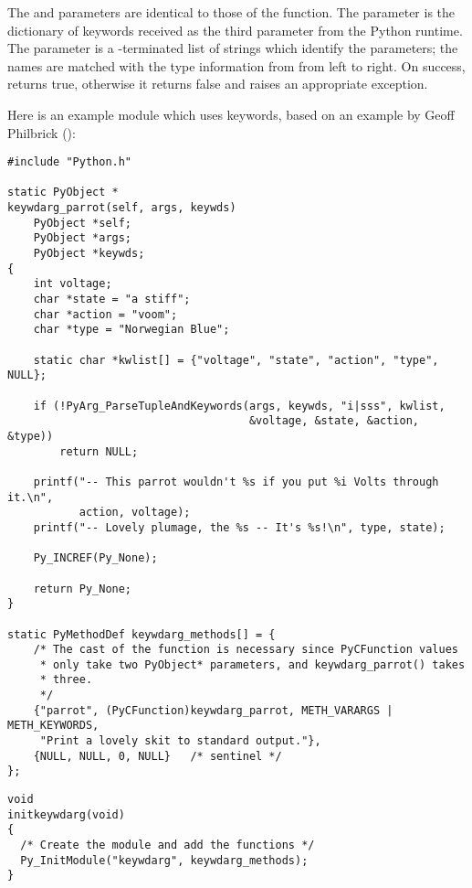 The  and  parameters are identical to those of the
 function.  The  parameter
is the dictionary of keywords received as the third parameter from the
Python runtime.  The  parameter is a \NULL-terminated
list of strings which identify the parameters; the names are matched
with the type information from  from left to right.  On
success,  returns true,
otherwise it returns false and raises an appropriate exception.


Here is an example module which uses keywords, based on an example by
Geoff Philbrick ():%

\begin{verbatim}
#include "Python.h"

static PyObject *
keywdarg_parrot(self, args, keywds)
    PyObject *self;
    PyObject *args;
    PyObject *keywds;
{  
    int voltage;
    char *state = "a stiff";
    char *action = "voom";
    char *type = "Norwegian Blue";

    static char *kwlist[] = {"voltage", "state", "action", "type", NULL};

    if (!PyArg_ParseTupleAndKeywords(args, keywds, "i|sss", kwlist, 
                                     &voltage, &state, &action, &type))
        return NULL; 
  
    printf("-- This parrot wouldn't %s if you put %i Volts through it.\n", 
           action, voltage);
    printf("-- Lovely plumage, the %s -- It's %s!\n", type, state);

    Py_INCREF(Py_None);

    return Py_None;
}

static PyMethodDef keywdarg_methods[] = {
    /* The cast of the function is necessary since PyCFunction values
     * only take two PyObject* parameters, and keywdarg_parrot() takes
     * three.
     */
    {"parrot", (PyCFunction)keywdarg_parrot, METH_VARARGS | METH_KEYWORDS,
     "Print a lovely skit to standard output."},
    {NULL, NULL, 0, NULL}   /* sentinel */
};
\end{verbatim}

\begin{verbatim}
void
initkeywdarg(void)
{
  /* Create the module and add the functions */
  Py_InitModule("keywdarg", keywdarg_methods);
}
\end{verbatim}



